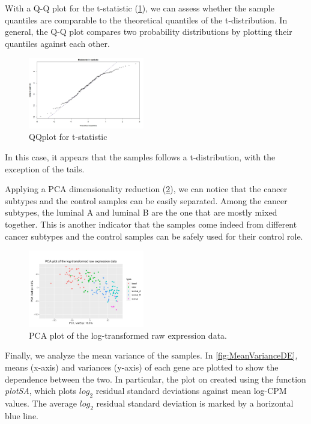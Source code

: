 \documentclass[journal]{IEEEtran}
\begin{document}
With a Q-Q plot for the t-statistic (\cref{fig:QQplotDE}), we can assess whether the sample quantiles are comparable to the theoretical quantiles of the t-distribution. In general, the Q-Q plot compares two probability distributions by plotting their quantiles against each other.

\begin{figure}[!ht]
    \centering
    \includegraphics[width=0.45\textwidth]{images/DE/QQplotDE.jpg}
    \caption{QQplot for t-statistic}
    \label{fig:QQplotDE}
\end{figure}

In this case, it appears that the samples follows a t-distribution, with the exception of the tails. 

Applying a PCA dimensionality reduction (\cref{fig:PCA}), we can notice that the cancer subtypes and the control samples can be easily separated. Among the cancer subtypes, the luminal A and luminal B are the one that are mostly mixed together. This is another indicator that the samples come indeed from different cancer subtypes and the control samples can be safely used for their control role.

\begin{figure}[!ht]
    \centering
    \includegraphics[width=0.45\textwidth]{images/PCA_nocell.jpg}
    \caption{PCA plot of the log-transformed raw expression data.}
    \label{fig:PCA}
\end{figure}


Finally, we analyze the mean variance of the samples. In \cref{fig:MeanVarianceDE}, means (x-axis) and variances (y-axis) of each gene are plotted to show the dependence between the two. In particular, the plot on created using the function \textit{plotSA}, which plots $log_2$ residual standard deviations against mean log-CPM values. The average $log_2$ residual standard deviation is marked by a horizontal blue line. 
\end{document}

